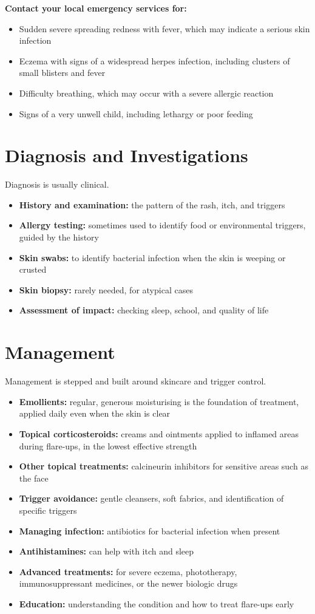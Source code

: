 \textbf{Contact your local emergency services for:}
\begin{itemize}
    \item Sudden severe spreading redness with fever, which may indicate a serious skin infection
    \item Eczema with signs of a widespread herpes infection, including clusters of small blisters and fever
    \item Difficulty breathing, which may occur with a severe allergic reaction
    \item Signs of a very unwell child, including lethargy or poor feeding
\end{itemize}

\section*{Diagnosis and Investigations}
Diagnosis is usually clinical.
\begin{itemize}
    \item \textbf{History and examination:} the pattern of the rash, itch, and triggers
    \item \textbf{Allergy testing:} sometimes used to identify food or environmental triggers, guided by the history
    \item \textbf{Skin swabs:} to identify bacterial infection when the skin is weeping or crusted
    \item \textbf{Skin biopsy:} rarely needed, for atypical cases
    \item \textbf{Assessment of impact:} checking sleep, school, and quality of life
\end{itemize}

\section*{Management}
Management is stepped and built around skincare and trigger control.
\begin{itemize}
    \item \textbf{Emollients:} regular, generous moisturising is the foundation of treatment, applied daily even when the skin is clear
    \item \textbf{Topical corticosteroids:} creams and ointments applied to inflamed areas during flare-ups, in the lowest effective strength
    \item \textbf{Other topical treatments:} calcineurin inhibitors for sensitive areas such as the face
    \item \textbf{Trigger avoidance:} gentle cleansers, soft fabrics, and identification of specific triggers
    \item \textbf{Managing infection:} antibiotics for bacterial infection when present
    \item \textbf{Antihistamines:} can help with itch and sleep
    \item \textbf{Advanced treatments:} for severe eczema, phototherapy, immunosuppressant medicines, or the newer biologic drugs
    \item \textbf{Education:} understanding the condition and how to treat flare-ups early
\end{itemize}

